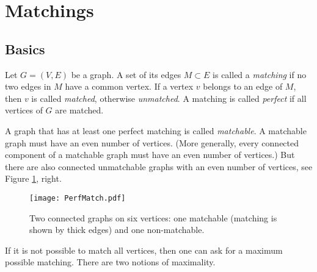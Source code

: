 \begin{page}
\setcounter{section}{4}
\setcounter{subsection}{1}
\setcounter{dfn}{0}
\label{portion:318}

\section{Matchings}

\end{page}

\begin{page}
\setcounter{section}{4}
\setcounter{subsection}{1}
\setcounter{dfn}{0}
\label{portion:319}

\subsection{Basics}

\end{page}

\begin{page}
\setcounter{section}{4}
\setcounter{subsection}{1}
\setcounter{dfn}{1}
\label{portion:321}

\begin{dfn}
Let $G = (V, E)$ be a graph.
A set of its edges $M \subset E$ is called a \emph{matching} if no two edges in $M$ have a common vertex.
If a vertex $v$ belongs to an edge of $M$, then $v$ is called \emph{matched}, otherwise \emph{unmatched}.
A matching is called \emph{perfect} if all vertices of $G$ are matched.
\end{dfn}

\end{page}

\begin{page}
\setcounter{section}{4}
\setcounter{subsection}{1}
\setcounter{dfn}{1}
\label{portion:322}


A graph that has at least one perfect matching is called \emph{matchable}.
A matchable graph must have an even number of vertices.
(More generally, every connected component of a matchable graph must have an even number of vertices.)
But there are also connected unmatchable graphs with an even number of vertices, see Figure \ref{fig:PerfMatch}, right.

\begin{figure}[ht]
\begin{center}
\texttt{[image: PerfMatch.pdf]}
\end{center}
\caption{Two connected graphs on six vertices: one matchable (matching is shown by thick edges) and one non-matchable.}
\label{fig:PerfMatch}
\end{figure}

If it is not possible to match all vertices, then one can ask for a maximum possible matching.
There are two notions of maximality.

\end{page}

